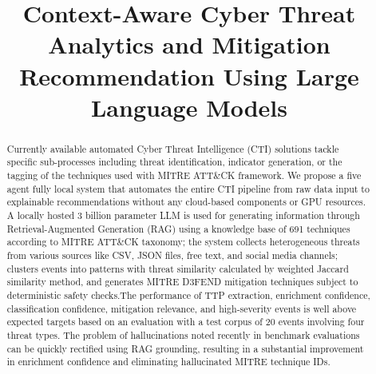\documentclass[conference]{IEEEtran}
\begin{document}
\title{%
  Context-Aware Cyber Threat Analytics and Mitigation
  Recommendation Using Large Language Models%
}

\author{
  \and
}

\maketitle

\begin{abstract}
Currently available automated Cyber Threat Intelligence (CTI) solutions tackle specific sub-processes including threat identification, indicator generation, or the tagging of the techniques used with MITRE ATT\&CK framework. We propose a five agent fully local system that automates the entire CTI pipeline from raw data input to explainable recommendations without any cloud-based components or GPU resources. A locally hosted 3 billion parameter LLM is used for generating information through Retrieval-Augmented Generation (RAG) using a knowledge base of 691 techniques according to MITRE ATT&CK taxonomy; the system collects heterogeneous threats from various sources like CSV, JSON files, free text, and social media channels; clusters events into patterns with threat similarity calculated by weighted Jaccard similarity method, and generates MITRE D3FEND mitigation techniques subject to deterministic safety checks.The performance of TTP extraction, enrichment confidence, classification confidence, mitigation relevance, and high-severity events is well above expected targets based on an evaluation with a test corpus of 20 events involving four threat types. The problem of hallucinations noted recently in benchmark evaluations can be quickly rectified using RAG grounding, resulting in a substantial improvement in enrichment confidence and eliminating hallucinated MITRE technique IDs.
\end{abstract}
\end{document}
